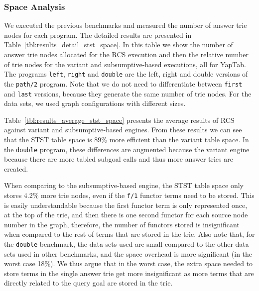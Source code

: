 

\subsubsection{Space Analysis}

We executed the previous benchmarks and measured the number of answer trie nodes for each program.
The detailed results are presented in Table~\ref{tbl:results_detail_stst_space}. In this table
we show the number of answer trie nodes allocated for the RCS execution and then the relative number
of trie nodes for the variant and subsumptive-based executions, all for YapTab.
The programs \texttt{left}, \texttt{right} and \texttt{double} are the left, right and double versions
of the \texttt{path/2} program. Note that we do not need to differentiate between \texttt{first} and
\texttt{last} versions, because they generate the same number of trie nodes. For the data sets, we used
graph configurations with different sizes.

Table~\ref{tbl:results_average_stst_space} presents the average results of RCS against variant and
subsumptive-based engines. From these results we can see that the STST table space is 89\% more efficient
than the variant table space. In the \texttt{double} program, these differences are augmented because the
variant engine because there are more tabled subgoal calls and thus more answer tries are created.

When comparing to the subsumptive-based engine, the STST table space only stores 4.2\% more trie nodes,
even if the \texttt{f/1} functor terms need to be stored. This is easily understandable because
the first functor term is only represented once, at the top of the trie, and then there is one second functor
for each source node number in the graph, therefore, the number of functors stored is insignificant when
compared to the rest of terms that are stored in the trie. Also note that, for the \texttt{double} benchmark,
the data sets used are small compared to the other data sets used in other benchmarks, and the space overhead
is more significant (in the worst case 18\%). We thus argue that in the worst case,
the extra space needed to store terms in the single answer trie get more insignificant as more terms
that are directly related to the query goal are stored in the trie.

